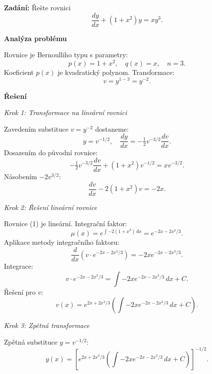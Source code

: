     \begin{example}
    \label{ex:l2-a2-stredni-kvadraticke}
    
    \noindent\textbf{Zadání:} Řešte rovnici
    \[
    \frac{dy}{dx} + (1 + x^2)y = x y^3.
    \]
    
    \vspace{1.5\baselineskip}
    
    \noindent\textbf{Analýza problému}
    
    \noindent Rovnice je Bernoulliho typu s parametry:
    \[
    p(x) = 1 + x^2, \quad q(x) = x, \quad n = 3.
    \]
    Koeficient $p(x)$ je kvadratický polynom. Transformace:
    \[
    v = y^{1-3} = y^{-2}.
    \]
    
    \vspace{1.5\baselineskip}
    
    \noindent\textbf{Řešení}
    
    \noindent\textit{Krok 1: Transformace na lineární rovnici}
    
    Zavedením substituce $v = y^{-2}$ dostaneme:
    \[
    y = v^{-1/2}, \quad \frac{dy}{dx} = -\tfrac{1}{2}v^{-3/2}\frac{dv}{dx}.
    \]
    Dosazením do původní rovnice:
    \[
    -\tfrac{1}{2}v^{-3/2}\frac{dv}{dx} + (1 + x^2)v^{-1/2} = x v^{-3/2}.
    \]
    Násobením $-2v^{3/2}$:
    \[
    \frac{dv}{dx} - 2(1 + x^2)v = -2x. \tag{1}
    \]
    
    \vspace{1\baselineskip}
    
    \noindent\textit{Krok 2: Řešení lineární rovnice}
    
    Rovnice (1) je lineární. Integrační faktor:
    \[
    \mu(x) = e^{\int -2(1 + x^2)\,dx} = e^{-2x - 2x^3/3}.
    \]
    Aplikace metody integračního faktoru:
    \[
    \frac{d}{dx}(v \cdot e^{-2x - 2x^3/3}) = -2x e^{-2x - 2x^3/3}.
    \]
    Integrace:
    \[
    v \cdot e^{-2x - 2x^3/3} = \int -2x e^{-2x - 2x^3/3}\,dx + C.
    \]
    Řešení pro $v$:
    \[
    v(x) = e^{2x + 2x^3/3} \left( \int -2x e^{-2x - 2x^3/3}\,dx + C \right). \tag{2}
    \]
    
    \vspace{1\baselineskip}
    
    \noindent\textit{Krok 3: Zpětná transformace}
    
    Zpětná substituce $y = v^{-1/2}$:
    \[
    y(x) = \left[ e^{2x + 2x^3/3} \left( \int -2x e^{-2x - 2x^3/3}\,dx + C \right) \right]^{-1/2}. \tag{3}
    \]
    
    \vspace{1.5\baselineskip}
    

\end{example}
